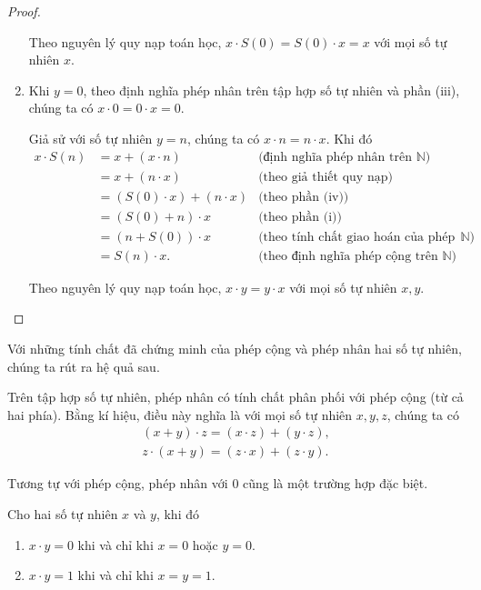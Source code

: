 \begin{proof}
\begin{enumerate}[label={(\roman*)}]
		      Theo nguyên lý quy nạp toán học, $x\cdot S(0) = S(0)\cdot x = x$ với mọi số tự nhiên $x$.
		\item Khi $y = 0$, theo định nghĩa phép nhân trên tập hợp số tự nhiên và phần (iii), chúng ta có $x\cdot 0 = 0\cdot x = 0$.

		      Giả sử với số tự nhiên $y = n$, chúng ta có $x\cdot n = n\cdot x$. Khi đó
		      \begin{align*}
			      x\cdot S(n) & = x + (x\cdot n)             & \text{(định nghĩa phép nhân trên $\mathbb{N}$)}                   \\
			                  & = x + (n\cdot x)             & \text{(theo giả thiết quy nạp)}                                   \\
			                  & = (S(0)\cdot x) + (n\cdot x) & \text{(theo phần (iv))}                                           \\
			                  & = (S(0) + n)\cdot x          & \text{(theo phần (i))}                                            \\
			                  & = (n + S(0))\cdot x          & \text{(theo tính chất giao hoán của phép cộng trên $\mathbb{N}$)} \\
			                  & = S(n)\cdot x.               & \text{(theo định nghĩa phép cộng trên $\mathbb{N}$)}
		      \end{align*}

		      Theo nguyên lý quy nạp toán học, $x\cdot y = y\cdot x$ với mọi số tự nhiên $x, y$.
	\end{enumerate}
\end{proof}

Với những tính chất đã chứng minh của phép cộng và phép nhân hai số tự nhiên, chúng ta rút ra hệ quả sau.

\begin{corollary}
	Trên tập hợp số tự nhiên, phép nhân có tính chất phân phối với phép cộng (từ cả hai phía). Bằng kí hiệu, điều này nghĩa là với mọi số tự nhiên $x, y, z$, chúng ta có
	\[
		\begin{split}
			(x + y)\cdot z = (x\cdot z) + (y\cdot z), \\
			z\cdot (x + y) = (z\cdot x) + (z\cdot y).
		\end{split}
	\]
\end{corollary}

Tương tự với phép cộng, phép nhân với $0$ cũng là một trường hợp đặc biệt.
\begin{theorem}\label{theorem:zero-one-and-natural-numbers-multiplication}
	Cho hai số tự nhiên $x$ và $y$, khi đó
	\begin{enumerate}[label={(\roman*)}]
		\item $x\cdot y = 0$ khi và chỉ khi $x = 0$ hoặc $y = 0$.
		\item $x\cdot y = 1$ khi và chỉ khi $x = y = 1$.
	\end{enumerate}
\end{theorem}

